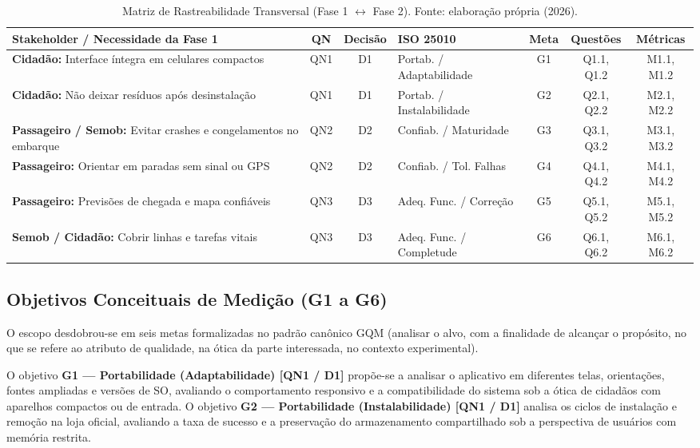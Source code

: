\documentclass[11pt,a4paper]{article}
\begin{document}
\begin{table}[!htbp]
\centering
\caption{Matriz de Rastreabilidade Transversal (Fase 1 $\leftrightarrow$ Fase 2). Fonte: elaboração própria (2026).}
\label{tab:rastreabilidade_transversal}
\scriptsize
\renewcommand{\arraystretch}{0.92}
\begin{tabularx}{\textwidth}{>{\raggedright\arraybackslash}p{4.2cm} c c >{\raggedright\arraybackslash}p{2.3cm} c c c}
\toprule
\textbf{Stakeholder / Necessidade da Fase 1} & \textbf{QN} & \textbf{Decisão} & \textbf{ISO 25010} & \textbf{Meta} & \textbf{Questões} & \textbf{Métricas} \\
\midrule
\textbf{Cidadão:} Interface íntegra em celulares compactos & QN1 & D1 & Portab. / Adaptabilidade & G1 & Q1.1, Q1.2 & M1.1, M1.2 \\
\textbf{Cidadão:} Não deixar resíduos após desinstalação & QN1 & D1 & Portab. / Instalabilidade & G2 & Q2.1, Q2.2 & M2.1, M2.2 \\
\textbf{Passageiro / Semob:} Evitar crashes e congelamentos no embarque & QN2 & D2 & Confiab. / Maturidade & G3 & Q3.1, Q3.2 & M3.1, M3.2 \\
\textbf{Passageiro:} Orientar em paradas sem sinal ou GPS & QN2 & D2 & Confiab. / Tol. Falhas & G4 & Q4.1, Q4.2 & M4.1, M4.2 \\
\textbf{Passageiro:} Previsões de chegada e mapa confiáveis & QN3 & D3 & Adeq. Func. / Correção & G5 & Q5.1, Q5.2 & M5.1, M5.2 \\
\textbf{Semob / Cidadão:} Cobrir linhas e tarefas vitais & QN3 & D3 & Adeq. Func. / Completude & G6 & Q6.1, Q6.2 & M6.1, M6.2 \\
\bottomrule
\end{tabularx}
\end{table}

\subsection{Objetivos Conceituais de Medição (G1 a G6)}
\label{sec:gqm_metas}

O escopo desdobrou-se em seis metas formalizadas no padrão canônico GQM (analisar o alvo, com a finalidade de alcançar o propósito, no que se refere ao atributo de qualidade, na ótica da parte interessada, no contexto experimental).

O objetivo \textbf{G1 --- Portabilidade (Adaptabilidade) [QN1 / D1]} propõe-se a analisar o aplicativo em diferentes telas, orientações, fontes ampliadas e versões de SO, avaliando o comportamento responsivo e a compatibilidade do sistema sob a ótica de cidadãos com aparelhos compactos ou de entrada. O objetivo \textbf{G2 --- Portabilidade (Instalabilidade) [QN1 / D1]} analisa os ciclos de instalação e remoção na loja oficial, avaliando a taxa de sucesso e a preservação do armazenamento compartilhado sob a perspectiva de usuários com memória restrita.
\end{document}
